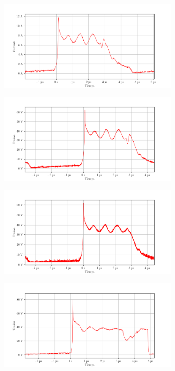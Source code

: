 \begin{figure}[ht]
    \centering
    \includegraphics[width=0.8\textwidth]{images/capturas-osciloscopio/17-11-2022/33.png}
    \caption{}
    \label{fig:osc:33}
\end{figure}

\begin{figure}[ht]
    \centering
    \includegraphics[width=0.8\textwidth]{images/capturas-osciloscopio/17-11-2022/34.png}
    \caption{}
    \label{fig:osc:34}
\end{figure}

\begin{figure}[ht]
    \centering
    \includegraphics[width=0.8\textwidth]{images/capturas-osciloscopio/17-11-2022/35.png}
    \caption{}
    \label{fig:osc:35}
\end{figure}

\begin{figure}[ht]
    \centering
    \includegraphics[width=0.8\textwidth]{images/capturas-osciloscopio/17-11-2022/36.png}
    \caption{}
    \label{fig:osc:36}
\end{figure}


